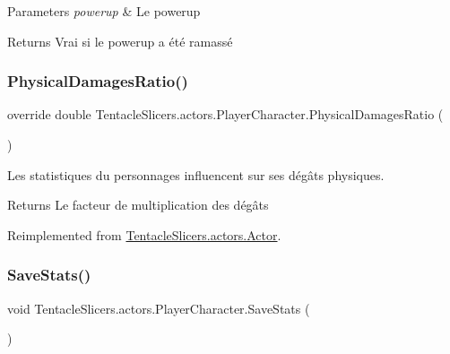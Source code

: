 \begin{DoxyParams}{Parameters}
{\em powerup} & Le powerup \\
\hline
\end{DoxyParams}
\begin{DoxyReturn}{Returns}
Vrai si le powerup a été ramassé 
\end{DoxyReturn}
\mbox{\label{class_tentacle_slicers_1_1actors_1_1_player_character_a1e6201247e550f29f061ac87c88c70f6}} 
\subsubsection{\texorpdfstring{Physical\+Damages\+Ratio()}{PhysicalDamagesRatio()}}
{\footnotesize\ttfamily override double Tentacle\+Slicers.\+actors.\+Player\+Character.\+Physical\+Damages\+Ratio (\begin{DoxyParamCaption}{ }\end{DoxyParamCaption})\hspace{0.3cm}{\ttfamily [virtual]}}



Les statistiques du personnages influencent sur ses dégâts physiques. 

\begin{DoxyReturn}{Returns}
Le facteur de multiplication des dégâts 
\end{DoxyReturn}


Reimplemented from \hyperlink{class_tentacle_slicers_1_1actors_1_1_actor_a8041088479e124a66c24d185f5385b2f}{Tentacle\+Slicers.\+actors.\+Actor}.

\mbox{\label{class_tentacle_slicers_1_1actors_1_1_player_character_a0d2e5ef0774b29ddff168c5c83c255aa}} 
\subsubsection{\texorpdfstring{Save\+Stats()}{SaveStats()}}
{\footnotesize\ttfamily void Tentacle\+Slicers.\+actors.\+Player\+Character.\+Save\+Stats (\begin{DoxyParamCaption}{ }\end{DoxyParamCaption})}



